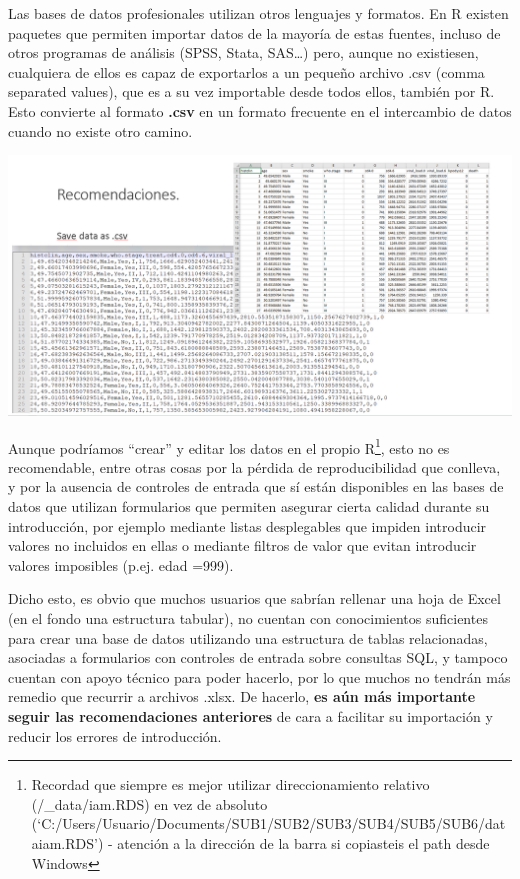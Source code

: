 \documentclass[
  letterpaper,
  DIV=11,
  numbers=noendperiod]{scrreprt}
\begin{document}
Las bases de datos profesionales utilizan otros lenguajes y formatos. En
R existen paquetes que permiten importar datos de la mayoría de estas
fuentes, incluso de otros programas de análisis (SPSS, Stata, SAS\ldots)
pero, aunque no existiesen, cualquiera de ellos es capaz de exportarlos
a un pequeño archivo .csv (comma separated values), que es a su vez
importable desde todos ellos, también por R. Esto convierte al formato
\textbf{.csv} en un formato frecuente en el intercambio de datos cuando
no existe otro camino.

\includegraphics{./pics/Recom_save_as_csv.png}

Aunque podríamos ``crear'' y editar los datos en el propio R\footnote{Recordad
  que siempre es mejor utilizar direccionamiento relativo
  (/\_data/iam.RDS) en vez de absoluto
  (`C:/Users/Usuario/Documents/SUB1/SUB2/SUB3/SUB4/SUB5/SUB6/dataiam.RDS')
  - atención a la dirección de la barra si copiasteis el path desde
  Windows}, esto no es recomendable, entre otras cosas por la pérdida de
reproducibilidad que conlleva, y por la ausencia de controles de entrada
que sí están disponibles en las bases de datos que utilizan formularios
que permiten asegurar cierta calidad durante su introducción, por
ejemplo mediante listas desplegables que impiden introducir valores no
incluidos en ellas o mediante filtros de valor que evitan introducir
valores imposibles (p.ej. edad =999).

Dicho esto, es obvio que muchos usuarios que sabrían rellenar una hoja
de Excel (en el fondo una estructura tabular), no cuentan con
conocimientos suficientes para crear una base de datos utilizando una
estructura de tablas relacionadas, asociadas a formularios con controles
de entrada sobre consultas SQL, y tampoco cuentan con apoyo técnico para
poder hacerlo, por lo que muchos no tendrán más remedio que recurrir a
archivos .xlsx. De hacerlo, \textbf{es aún más importante seguir las
recomendaciones anteriores} de cara a facilitar su importación y reducir
los errores de introducción.
\end{document}
